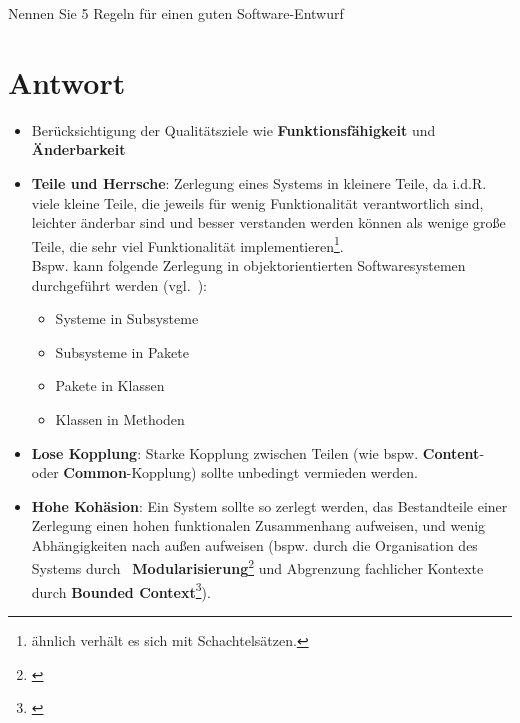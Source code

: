 Nennen Sie 5 Regeln für einen guten Software-Entwurf

\section*{Antwort}

\begin{itemize}
    \item Berücksichtigung der Qualitätsziele wie \textbf{Funktionsfähigkeit} und \textbf{Änderbarkeit}
    \item \textbf{Teile und Herrsche}: Zerlegung eines Systems in kleinere Teile, da i.d.R. viele kleine Teile, die jeweils für wenig Funktionalität verantwortlich sind, leichter änderbar sind und besser verstanden werden können als wenige große Teile, die sehr viel Funktionalität implementieren\footnote{
    ähnlich verhält es sich mit Schachtelsätzen.
    }.\\
    Bspw. kann folgende Zerlegung in objektorientierten Softwaresystemen durchgeführt werden (vgl.~\cite[70]{Wed09b}):
        \begin{itemize}
            \item Systeme in Subsysteme
            \item Subsysteme in Pakete
            \item Pakete in Klassen
            \item Klassen in Methoden
        \end{itemize}
    \item \textbf{Lose Kopplung}: Starke Kopplung zwischen Teilen (wie bspw. \textbf{Content}- oder \textbf{Common}-Kopplung) sollte unbedingt vermieden werden.
    \item \textbf{Hohe Kohäsion}: Ein System sollte so zerlegt werden, das Bestandteile einer Zerlegung einen hohen funktionalen Zusammenhang aufweisen, und wenig Abhängigkeiten nach außen aufweisen (bspw. durch die Organisation des Systems durch ~\textbf{Modularisierung}\footnote{
    \cite{Par72}
    } und Abgrenzung fachlicher Kontexte durch \textbf{Bounded Context}\footnote{\cite[335 ff.]{Eva03}}).
\end{itemize}
